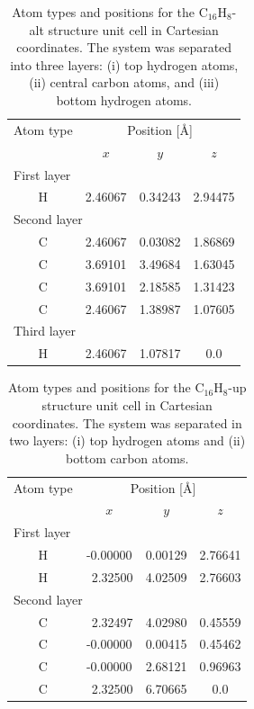 \documentclass[pss]{wiley2sp} %
\begin{document}
\begin{table}[t]
\centering
\begin{tabular}{cccc}
\hline
\hline
Atom type &  \multicolumn{3}{c}{Position [\AA] } \\
\cline{2-4}
& $x$ & $y$ & $z$ \\
\hline
\multicolumn{2}{l}{First layer}\\
H & 2.46067 & 0.34243 & 2.94475 \\
\multicolumn{2}{l}{Second layer}\\
C & 2.46067 & 0.03082 & 1.86869 \\
C & 3.69101 & 3.49684 & 1.63045 \\
C & 3.69101 & 2.18585 & 1.31423 \\
C & 2.46067 & 1.38987 & 1.07605 \\
\multicolumn{2}{l}{Third layer}\\
H & 2.46067 & 1.07817 & 0.0 \\
\hline
\hline
\end{tabular}
\caption[]{%
Atom types and positions for the C$_{16}$H$_{8}$-alt structure unit cell in
Cartesian coordinates. The system was separated into three layers: (i) top
hydrogen atoms, (ii) central carbon atoms, and (iii) bottom hydrogen atoms.
\label{tab:altstrc}}
\end{table}
\begin{table}[t]
\centering
\begin{tabular}{cccc}
\hline
\hline
Atom type &  \multicolumn{3}{c}{Position [\AA]} \\
\cline{2-4}
& $x$ & $y$ & $z$ \\
\hline
\multicolumn{2}{l}{First layer}\\
H &  -0.00000 & 0.00129 &  2.76641 \\
H & \ 2.32500 & 4.02509 &  2.76603 \\
\multicolumn{2}{l}{Second layer}\\
C & \ 2.32497 & 4.02980 &  0.45559 \\
C &  -0.00000 & 0.00415 &  0.45462 \\
C &  -0.00000 & 2.68121 &  0.96963 \\
C & \ 2.32500 & 6.70665 &  0.0     \\
\hline
\hline
\end{tabular}
\caption[]{%
Atom types and positions for the C$_{16}$H$_{8}$-up structure unit cell in
Cartesian coordinates. The system was separated in two layers: (i) top
hydrogen atoms and (ii) bottom carbon atoms.}
\label{tab:upstrc}
\end{table}
\end{document}
